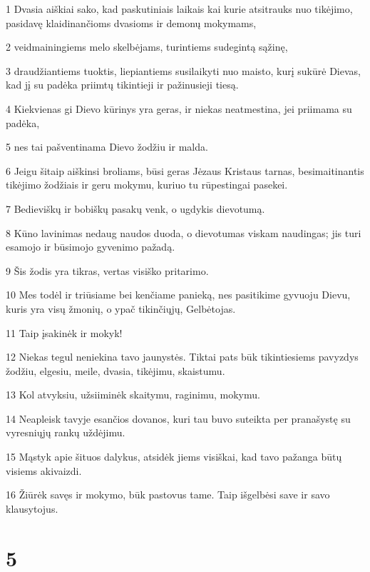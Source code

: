 \par 1 Dvasia aiškiai sako, kad paskutiniais laikais kai kurie atsitrauks nuo tikėjimo, pasidavę klaidinančioms dvasioms ir demonų mokymams, 
\par 2 veidmainingiems melo skelbėjams, turintiems sudegintą sąžinę, 
\par 3 draudžiantiems tuoktis, liepiantiems susilaikyti nuo maisto, kurį sukūrė Dievas, kad jį su padėka priimtų tikintieji ir pažinusieji tiesą. 
\par 4 Kiekvienas gi Dievo kūrinys yra geras, ir niekas neatmestina, jei priimama su padėka, 
\par 5 nes tai pašventinama Dievo žodžiu ir malda. 
\par 6 Jeigu šitaip aiškinsi broliams, būsi geras Jėzaus Kristaus tarnas, besimaitinantis tikėjimo žodžiais ir geru mokymu, kuriuo tu rūpestingai pasekei. 
\par 7 Bedieviškų ir bobiškų pasakų venk, o ugdykis dievotumą. 
\par 8 Kūno lavinimas nedaug naudos duoda, o dievotumas viskam naudingas; jis turi esamojo ir būsimojo gyvenimo pažadą. 
\par 9 Šis žodis yra tikras, vertas visiško pritarimo. 
\par 10 Mes todėl ir triūsiame bei kenčiame panieką, nes pasitikime gyvuoju Dievu, kuris yra visų žmonių, o ypač tikinčiųjų, Gelbėtojas. 
\par 11 Taip įsakinėk ir mokyk! 
\par 12 Niekas tegul neniekina tavo jaunystės. Tiktai pats būk tikintiesiems pavyzdys žodžiu, elgesiu, meile, dvasia, tikėjimu, skaistumu. 
\par 13 Kol atvyksiu, užsiiminėk skaitymu, raginimu, mokymu. 
\par 14 Neapleisk tavyje esančios dovanos, kuri tau buvo suteikta per pranašystę su vyresniųjų rankų uždėjimu. 
\par 15 Mąstyk apie šituos dalykus, atsidėk jiems visiškai, kad tavo pažanga būtų visiems akivaizdi. 
\par 16 Žiūrėk savęs ir mokymo, būk pastovus tame. Taip išgelbėsi save ir savo klausytojus.


\chapter{5}

